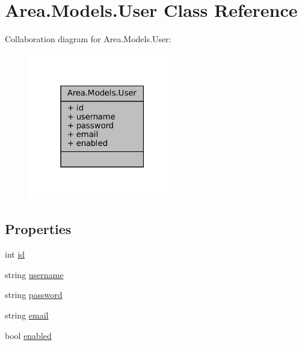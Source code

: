 \hypertarget{classArea_1_1Models_1_1User}{}\section{Area.\+Models.\+User Class Reference}
\label{classArea_1_1Models_1_1User}


Collaboration diagram for Area.\+Models.\+User\+:
\nopagebreak
\begin{figure}[H]
\begin{center}
\leavevmode
\includegraphics[width=183pt]{classArea_1_1Models_1_1User__coll__graph}
\end{center}
\end{figure}
\subsection*{Properties}
\begin{DoxyCompactItemize}
\item 
int \mbox{\hyperlink{classArea_1_1Models_1_1User_adfef3c1957513852f4044c458bc659c7}{id}}
\item 
string \mbox{\hyperlink{classArea_1_1Models_1_1User_aa8dd2b8cd2c1550a96a53523fd4f5026}{username}}
\item 
string \mbox{\hyperlink{classArea_1_1Models_1_1User_a4c1a1e36e6f0ecf9659e7e2021de9fc6}{password}}
\item 
string \mbox{\hyperlink{classArea_1_1Models_1_1User_a97a6699043c903bc958de05a770e2534}{email}}
\item 
bool \mbox{\hyperlink{classArea_1_1Models_1_1User_aab6daeaccd308ba30a2a6766daef536a}{enabled}}
\end{DoxyCompactItemize}


